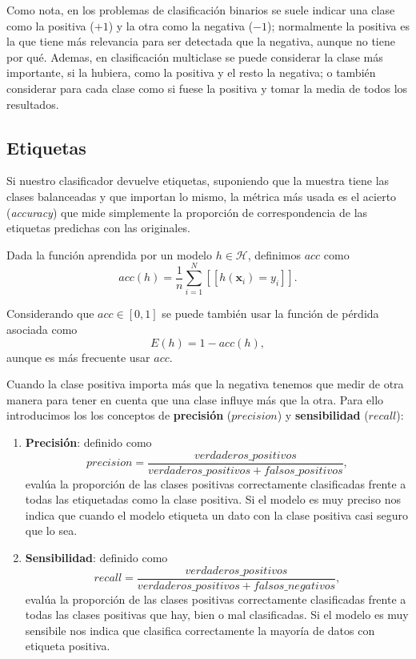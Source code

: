 Como nota, en los problemas de clasificación binarios se suele indicar una clase como la positiva ($+1$) y la otra como la negativa ($-1$); normalmente la positiva es la que tiene más relevancia para ser detectada que la negativa, aunque no tiene por qué. Ademas, en clasificación multiclase se puede considerar la clase más importante, si la hubiera, como la positiva y el resto la negativa; o también considerar para cada clase como si fuese la positiva y tomar la media de todos los resultados.

\subsection{Etiquetas}

Si nuestro clasificador devuelve etiquetas, suponiendo que la muestra tiene las clases balanceadas y que importan lo mismo, la métrica más usada es el acierto (\emph{accuracy}) que mide simplemente la proporción de correspondencia de las etiquetas predichas con las originales.

Dada la función aprendida por un modelo $h \in \mathcal{H}$, definimos $acc$ como
\begin{equation*}
  acc(h) = \frac{1}{n} \sum \limits^N_{i = 1}[[h(\textbf{x}_i) = y_i]].
  \label{eq:acc}
\end{equation*}

Considerando que $acc \in [0, 1]$ se puede también usar la función de pérdida asociada como
\begin{equation*}
  E(h) = 1 - acc(h),
  \label{eq:acc_loss}
\end{equation*}
aunque es más frecuente usar $acc$.

Cuando la clase positiva importa más que la negativa tenemos que medir de otra manera para tener en cuenta que una clase influye más que la otra. Para ello introducimos los los conceptos de \textbf{precisión} ($precision$) y \textbf{sensibilidad} ($recall$):

\begin{enumerate}
  \item \textbf{Precisión}: definido como
    \begin{equation*}
      precision = \dfrac{verdaderos\_positivos}{verdaderos\_positivos + falsos\_positivos},
      \label{eq:precision}
    \end{equation*}
    evalúa la proporción de las clases positivas correctamente clasificadas frente a todas las etiquetadas como la clase positiva. Si el modelo es muy preciso nos indica que cuando el modelo etiqueta un dato con la clase positiva casi seguro que lo sea.
  \item \textbf{Sensibilidad}: definido como
  \begin{equation*}
    recall = \dfrac{verdaderos\_positivos}{verdaderos\_positivos + falsos\_negativos},
    \label{eq:recall}
  \end{equation*}
  evalúa la proporción de las clases positivas correctamente clasificadas frente a todas las clases positivas que hay, bien o mal clasificadas. Si el modelo es muy sensibile nos indica que clasifica correctamente la mayoría de datos con etiqueta positiva.
\end{enumerate}

